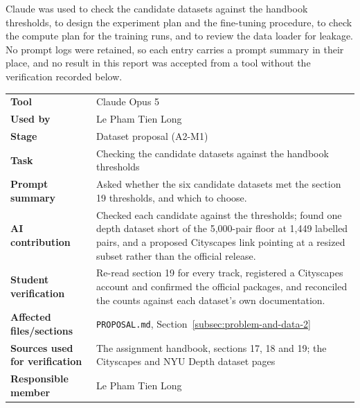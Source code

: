 
Claude was used to check the candidate datasets against the handbook thresholds, to design the
experiment plan and the fine-tuning procedure, to check the compute plan for the training runs,
and to review the data loader for leakage. No prompt logs were retained, so each entry carries a
prompt summary in their place, and no result in this report was accepted from a tool without the
verification recorded below.

\noindent\begin{minipage}{\textwidth}
\begin{tabularx}{\textwidth}{lX}
\hline
\textbf{Tool} & Claude Opus 5 \\
\textbf{Used by} & Le Pham Tien Long \\
\textbf{Stage} & Dataset proposal (A2-M1) \\
\textbf{Task} & Checking the candidate datasets against the handbook thresholds \\
\textbf{Prompt summary} & Asked whether the six candidate datasets met the section 19 thresholds, and which to choose. \\
\textbf{AI contribution} & Checked each candidate against the thresholds; found one depth dataset short of the 5,000-pair floor at 1,449 labelled pairs, and a proposed Cityscapes link pointing at a resized subset rather than the official release. \\
\textbf{Student verification} & Re-read section 19 for every track, registered a Cityscapes account and confirmed the official packages, and reconciled the counts against each dataset's own documentation. \\
\textbf{Affected files/sections} & \texttt{PROPOSAL.md}, Section~\ref{subsec:problem-and-data-2} \\
\textbf{Sources used for verification} & The assignment handbook, sections 17, 18 and 19; the Cityscapes and NYU Depth dataset pages \\
\textbf{Responsible member} & Le Pham Tien Long \\
\hline
\end{tabularx}
\end{minipage}

